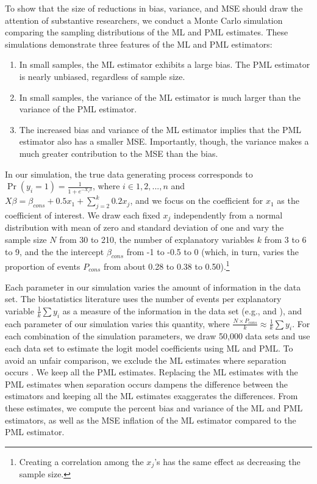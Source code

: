 \documentclass[12pt]{article}
\begin{document}
To show that the size of reductions in bias, variance, and MSE should draw the attention of substantive researchers, we conduct a Monte Carlo simulation comparing the sampling distributions of the ML and PML estimates.
These simulations demonstrate three features of the ML and PML estimators:
\begin{enumerate}
\item In small samples, the ML estimator exhibits a large bias. The PML estimator is nearly unbiased, regardless of sample size.
\item In small samples, the variance of the ML estimator is much larger than the variance of the PML estimator.
\item The increased bias and variance of the ML estimator implies that the PML estimator also has a smaller MSE. Importantly, though, the variance makes a much greater contribution to the MSE than the bias.
\end{enumerate}

In our simulation, the true data generating process corresponds to $\Pr(y_i = 1) = \frac{1}{1 + e^{-X_i \beta}}$, where $i \in 1, 2,..., n$ and $X \beta = \beta_{cons} + 0.5 x_1 + \sum_{j = 2}^k 0.2 x_j$, and we focus on the coefficient for $x_1$ as the coefficient of interest.
We draw each fixed $x_j$ independently from a normal distribution with mean of zero and standard deviation of one and vary the sample size $N$ from 30 to 210, the number of explanatory variables $k$ from 3 to 6 to 9, and the the intercept $\beta_{cons}$ from -1 to -0.5 to 0 (which, in turn, varies the proportion of events $P_{cons}$ from about 0.28 to 0.38 to 0.50).\footnote{Creating a correlation among the $x_j$'s has the same effect as decreasing the sample size.}

Each parameter in our simulation varies the amount of information in the data set.
The biostatistics literature uses the number of events per explanatory variable $\frac{1}{k}\sum y_i$ as a measure of the information in the data set (e.g., \citealt{Peduzzietal1996} and \citealt{VittinghoffMcCulloch2007}), and each parameter of our simulation varies this quantity, where $ \frac{N \times P_{cons}}{k} \approx \frac{1}{k}\sum y_i$.
For each combination of the simulation parameters, we draw 50,000 data sets and use each data set to estimate the logit model coefficients using ML and PML. 
To avoid an unfair comparison, we exclude the ML estimates where separation occurs \citep{Zorn2005}. 
We keep all the PML estimates.
Replacing the ML estimates with the PML estimates when separation occurs dampens the difference between the estimators and keeping all the ML estimates exaggerates the differences.
From these estimates, we compute the percent bias and variance of the ML and PML estimators, as well as the MSE inflation of the ML estimator compared to the PML estimator.
\end{document}
